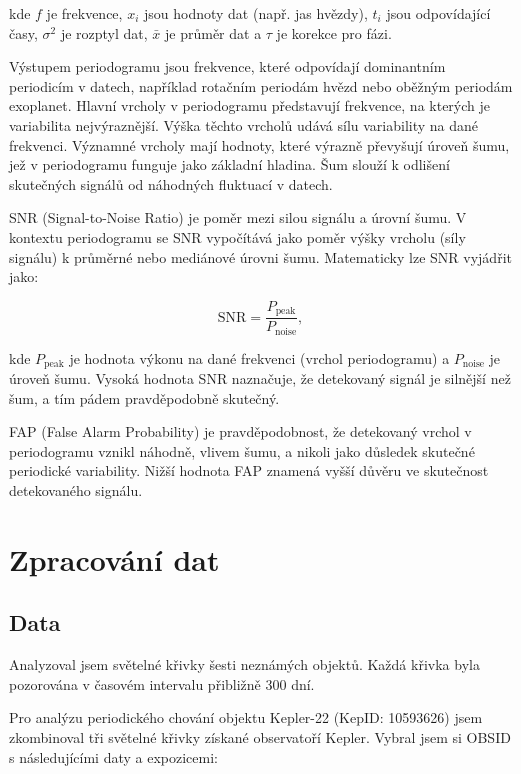 \documentclass[a4paper,11pt,twocolumn]{article}
\begin{document}
        kde $f$ je frekvence, $x_i$ jsou hodnoty dat (např. jas hvězdy), $t_i$ jsou odpovídající časy, $\sigma^2$ je rozptyl dat, $\bar{x}$ je průměr dat a $\tau$  je korekce pro fázi.
            
        Výstupem periodogramu jsou frekvence, které odpovídají dominantním periodicím v datech, například rotačním periodám hvězd nebo oběžným periodám exoplanet. Hlavní vrcholy v periodogramu představují frekvence, na kterých je variabilita nejvýraznější. Výška těchto vrcholů udává sílu variability na dané frekvenci. Významné vrcholy mají hodnoty, které výrazně převyšují úroveň šumu, jež v periodogramu funguje jako základní hladina. Šum slouží k odlišení skutečných signálů od náhodných fluktuací v datech.

        SNR (Signal-to-Noise Ratio) je poměr mezi silou signálu a úrovní šumu. V kontextu periodogramu se SNR vypočítává jako poměr výšky vrcholu (síly signálu) k průměrné nebo mediánové úrovni šumu. Matematicky lze SNR vyjádřit jako:

        \begin{equation*}
            \text{SNR} = \frac{P_{\text{peak}}}{P_{\text{noise}}},
        \end{equation*}

        kde $P_{\text{peak}}$ je hodnota výkonu na dané frekvenci (vrchol periodogramu) a $P_{\text{noise}}$ je úroveň šumu. Vysoká hodnota SNR naznačuje, že detekovaný signál je silnější než šum, a tím pádem pravděpodobně skutečný.

        FAP (False Alarm Probability) je pravděpodobnost, že detekovaný vrchol v periodogramu vznikl náhodně, vlivem šumu, a nikoli jako důsledek skutečné periodické variability. Nižší hodnota FAP znamená vyšší důvěru ve skutečnost detekovaného signálu.

    \section{Zpracování dat}
        \subsection{Data}
            Analyzoval jsem světelné křivky šesti neznámých objektů. Každá křivka byla pozorována v časovém intervalu přibližně 300 dní. 

            Pro analýzu periodického chování objektu Kepler-22 (KepID: 10593626) jsem zkombinoval tři světelné křivky získané observatoří Kepler. Vybral jsem si OBSID s následujícími daty a expozicemi:
\end{document}
